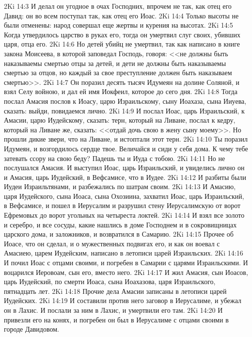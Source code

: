 \vs 2Ki 14:3 И делал он угодное в очах Господних, впрочем не так, как отец его Давид: он во всем поступал так, как отец его Иоас.
\vs 2Ki 14:4 Только высоты не были отменены: народ совершал еще жертвы и курения на высотах.
\rsbpar\vs 2Ki 14:5 Когда утвердилось царство в руках его, тогда он умертвил слуг своих, убивших царя, отца его.
\vs 2Ki 14:6 Но детей убийц не умертвил, так как написано в книге закона Моисеева, в которой заповедал Господь, говоря: <<не должны быть наказываемы смертью отцы за детей, и дети не должны быть наказываемы смертью за отцов, но каждый за свое преступление должен быть наказываем смертью>>.
\vs 2Ki 14:7 Он поразил десять тысяч Идумеян на долине Соляной, и взял Селу войною, и дал ей имя Иокфеил, которое  до сего дня.
\rsbpar\vs 2Ki 14:8 Тогда послал Амасия послов к Иоасу, царю Израильскому, сыну Иоахаза, сына Ииуева, сказать: выйди, повидаемся лично.
\vs 2Ki 14:9 И послал Иоас, царь Израильский, к Амасии, царю Иудейскому, сказать: терн, который на Ливане, послал к кедру, который на Ливане же, сказать: <<отдай дочь свою в жену сыну моему>>. Но прошли дикие звери, что на Ливане, и истоптали этот терн.
\vs 2Ki 14:10 Ты поразил Идумеян, и возгордилось сердце твое. Величайся и сиди у себя дома. К чему тебе затевать ссору на свою беду? Падешь ты и Иуда с тобою.
\vs 2Ki 14:11 Но не послушался Амасия. И выступил Иоас, царь Израильский, и увиделись лично он и Амасия, царь Иудейский, в Вефсамисе, что в Иудее.
\vs 2Ki 14:12 И разбиты были Иудеи Израильтянами, и разбежались по шатрам своим.
\vs 2Ki 14:13 И Амасию, царя Иудейского, сына Иоаса, сына Охозиина, захватил Иоас, царь Израильский, в Вефсамисе, и пошел в Иерусалим и разрушил стену Иерусалимскую от ворот Ефремовых до ворот угольных на четыреста локтей.
\vs 2Ki 14:14 И взял все золото и серебро, и все сосуды, какие нашлись в доме Господнем и в сокровищницах царского дома, и заложников, и возвратился в Самарию.
\rsbpar\vs 2Ki 14:15 Прочее об Иоасе, что он сделал, и о мужественных подвигах его, и как он воевал с Амасиею, царем Иудейским, написано в летописи царей Израильских.
\vs 2Ki 14:16 И почил Иоас с отцами своими, и погребен в Самарии с царями Израильскими. И воцарился Иеровоам, сын его, вместо него.
\rsbpar\vs 2Ki 14:17 И жил Амасия, сын Иоасов, царь Иудейский, по смерти Иоаса, сына Иоахазова, царя Израильского, пятнадцать лет.
\rsbpar\vs 2Ki 14:18 Прочие дела Амасии записаны в летописи царей Иудейских.
\vs 2Ki 14:19 И составили против него заговор в Иерусалиме, и убежал он в Лахис. И послали за ним в Лахис, и умертвили его там.
\vs 2Ki 14:20 И привезли его на конях, и погребен он был в Иерусалиме с отцами своими в городе Давидовом.
